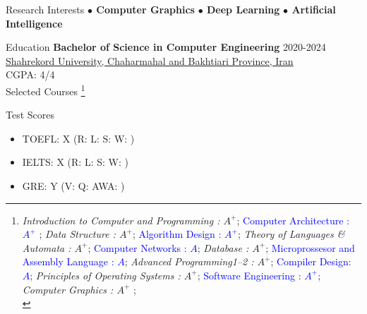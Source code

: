 \documentclass{resume} %
\begin{document}
    \begin{rSection}{Research Interests}
        \textbf{$\bullet$ Computer Graphics} \hspace*{16pt}
        \textbf{$\bullet$ Deep Learning}\hspace*{16pt}
        \textbf{$\bullet$ Artificial Intelligence}\hspace*{16pt}
    \end{rSection}

    \begin{rSection}{Education}
    {\bf Bachelor of Science in Computer Engineering} \hfill {2020-2024} \\ %
        \href{https://sku.ac.ir}{\textcolor{coolblack}{Shahrekord University, Chaharmahal and Bakhtiari Province, Iran}}\\ %
        CGPA: 4/4\\ %
        Selected Courses
        \footnote{\textit{Introduction to Computer and Programming : $A^{+}$};
        \textcolor{blue}{Computer Architecture : $A^{+}$ }; \textit{Data Structure : $A^{+}$};
        \textcolor{blue}{Algorithm Design : $A^{+}$}; \textit{Theory of Languages \& Automata : $A^{+}$};
        \textcolor{blue}{Computer Networks : $A$}; \textit{Database : $A^{+}$};
        \textcolor{blue}{Microprossesor and Assembly Language : $A$}; \textit{Advanced Programming1--2 : $A^{+}$};
        \textcolor{blue}{Compiler Design: $A$}; \textit{Principles of Operating Systems : $A^{+}$};
        \textcolor{blue}{Software Engineering : $A^{+}$}; \textit{Computer Graphics : $A^{+}$ }; \\}
    \end{rSection}

    \begin{rSection}{Test Scores}
        \begin{itemize}{\bfseries}
            \item { TOEFL: X (R:  L:  S:  W: )}
            \item { IELTS: X (R:  L:  S:  W: )}
            \item { GRE:   Y (V:  Q:  AWA: )}
        \end{itemize}
    \end{rSection}
\end{document}
